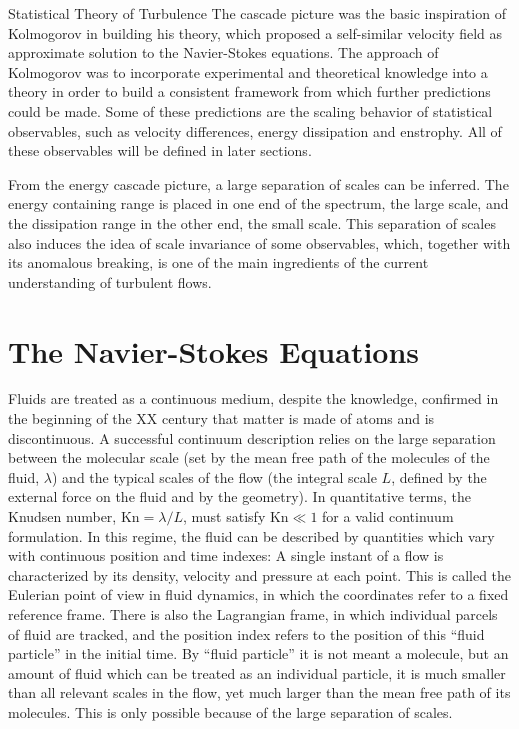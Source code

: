 \begin{chapter}{Statistical Theory of Turbulence}
The cascade picture was the basic inspiration of Kolmogorov in building
his theory, which proposed a self-similar velocity
field as approximate solution to the Navier-Stokes equations.
The approach of Kolmogorov was to incorporate experimental
and theoretical knowledge into a theory in order to build
a consistent framework from which further predictions could
be made. Some of these predictions are the scaling behavior
of statistical observables, such as velocity differences,
energy dissipation and enstrophy. All of these observables will
be defined in later sections.

From the energy cascade picture, a large separation of scales can be inferred.
The energy containing range is placed in one end of the spectrum, the large scale,
and the dissipation range in the other end, the small scale.
This separation of scales also induces the idea of scale invariance
of some observables, which, together with its anomalous breaking, is one of the main ingredients of the current understanding of turbulent flows.

\section{The Navier-Stokes Equations}

Fluids are treated as a continuous medium, despite
the knowledge, confirmed in the beginning of the XX century that matter
is made of atoms and is discontinuous.
A successful continuum description relies on the large separation
between the molecular scale (set by the mean free path of the molecules of the fluid, $\lambda$) and the typical scales of the flow
(the integral scale $L$, defined by the external force on the fluid and by the geometry).
In quantitative terms, the Knudsen number, $\mathrm{Kn} = \lambda/L$, must satisfy $\mathrm{Kn} \ll 1$ for a valid continuum formulation.
In this regime, the fluid can be described by quantities which
vary with continuous position and time indexes: A single instant of a flow is characterized by its density, velocity and pressure at each point.
This is called the Eulerian point of view in fluid dynamics, in which the
coordinates refer to a fixed reference frame.
There is also the Lagrangian frame, in which individual parcels
of fluid are tracked, and the position index refers to the position
of this \enquote{fluid particle} in the initial time.
By \enquote{fluid particle} it is not meant a molecule, but
an amount of fluid which can be treated as an individual particle,
it is much smaller than all relevant scales in the flow, yet much larger
than the mean free path of its molecules. This is only possible
because of the large separation of scales.


\end{chapter}
